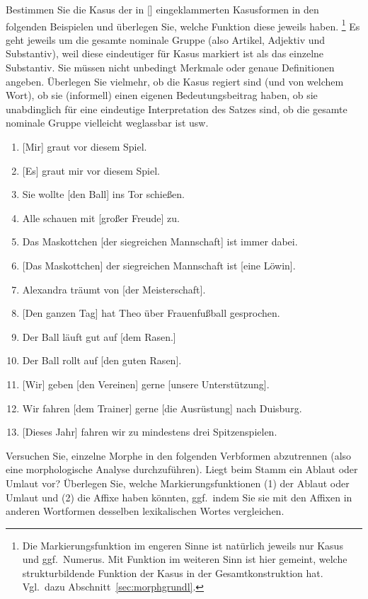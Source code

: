 \Uebungen

\Uebung[\tristar] \label{u61} Bestimmen Sie die Kasus der in [] eingeklammerten Kasusformen in den folgenden Beispielen und überlegen Sie, welche Funktion diese jeweils haben.%
\footnote{Die Markierungsfunktion im engeren Sinne ist natürlich jeweils nur Kasus und ggf.\ Numerus.
Mit Funktion im weiteren Sinn ist hier gemeint, welche strukturbildende Funktion der Kasus in der Gesamtkonstruktion hat.
Vgl.\ dazu Abschnitt~\ref{sec:morphgrundl}.}
Es geht jeweils um die gesamte nominale Gruppe (also Artikel, Adjektiv und Substantiv), weil diese eindeutiger für Kasus markiert ist als das einzelne Substantiv.
Sie müssen nicht unbedingt Merkmale oder genaue Definitionen angeben.
Überlegen Sie vielmehr, ob die Kasus regiert sind (und von welchem Wort), ob sie (informell) einen eigenen Bedeutungsbeitrag haben, ob sie unabdinglich für eine eindeutige Interpretation des Satzes sind, ob die gesamte nominale Gruppe vielleicht weglassbar ist usw.

\begin{enumerate}\Lf
  \item {[Mir]} graut vor diesem Spiel.
  \item {[Es]} graut mir vor diesem Spiel.
  \item Sie wollte {[den Ball]} ins Tor schießen.
  \item Alle schauen mit {[großer Freude]} zu.
  \item Das Maskottchen {[der siegreichen Mannschaft]} ist immer dabei.
  \item {[Das Maskottchen]} der siegreichen Mannschaft ist {[eine Löwin]}.
  \item Alexandra träumt von {[der Meisterschaft]}.
  \item {[Den ganzen Tag]} hat Theo über Frauenfußball gesprochen.
  \item Der Ball läuft gut auf {[dem Rasen.]}
  \item Der Ball rollt auf {[den guten Rasen]}.
  \item {[Wir]} geben {[den Vereinen]} gerne {[unsere Unterstützung]}.
  \item Wir fahren {[dem Trainer]} gerne {[die Ausrüstung]} nach Duisburg.
  \item {[Dieses Jahr]} fahren wir zu mindestens drei Spitzenspielen.
\end{enumerate}

\Uebung[\tristar] \label{u62} Versuchen Sie, einzelne Morphe in den folgenden Verbformen abzutrennen (also eine morphologische Analyse durchzuführen).
Liegt beim Stamm ein Ablaut oder Umlaut vor?
Überlegen Sie, welche Markierungsfunktionen (1) der Ablaut oder Umlaut und (2) die Affixe haben könnten, ggf.\ indem Sie sie mit den Affixen in anderen Wortformen desselben lexikalischen Wortes vergleichen.

